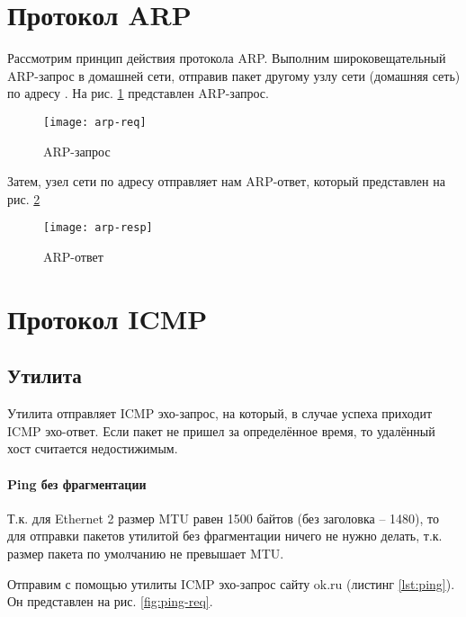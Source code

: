 

\section{Протокол ARP}

Рассмотрим принцип действия протокола ARP. Выполним широковещательный ARP-запрос в домашней сети, отправив  пакет другому узлу сети (домашняя сеть) по адресу .  На рис. \ref{fig:arp-req} представлен ARP-запрос.

\begin{figure}[H]
	\centering
	\texttt{[image: arp-req]}
	\caption{ARP-запрос}
	\label{fig:arp-req}
\end{figure}

Затем, узел сети по адресу  отправляет нам ARP-ответ, который представлен на рис. \ref{fig:arp-resp}

\begin{figure}[H]
	\centering
	\texttt{[image: arp-resp]}
	\caption{ARP-ответ}
	\label{fig:arp-resp}
\end{figure}

\section{Протокол ICMP}

\subsection{Утилита }

Утилита  отправляет ICMP эхо-запрос, на который, в случае успеха приходит ICMP эхо-ответ. Если пакет не пришел за определённое время, то удалённый хост считается недостижимым.

\paragraph{Ping без фрагментации}

Т.к. для Ethernet 2 размер MTU равен 1500 байтов (без заголовка -- 1480), то для отправки пакетов утилитой  без фрагментации ничего не нужно делать, т.к. размер пакета по умолчанию не превышает MTU.

Отправим с помощью утилиты  ICMP эхо-запрос сайту ok.ru (листинг \ref{lst:ping}). Он представлен на рис. \ref{fig:ping-req}.

